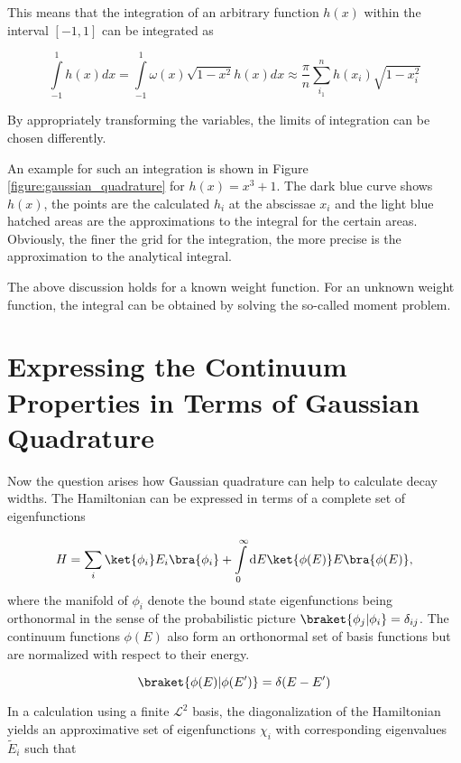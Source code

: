 This means that the integration of an arbitrary function $h(x)$ within
the interval $[-1,1]$ can be integrated as

\begin{equation}
  \int\limits_{-1}^1 h(x) dx = \int\limits_{-1}^1 \omega(x) \sqrt{1-x^2} h(x) dx
  \approx \frac \pi n \sum\limits_{i_1}^n h(x_i) \sqrt{1-x_i^2}
\end{equation}

By appropriately transforming the variables, the limits of integration can be
chosen differently.

An example for such an integration is shown in Figure \ref{figure:gaussian_quadrature}
for $h(x) = x^3 + 1$. The dark blue curve shows $h(x)$, the points are the
calculated $h_i$ at the abscissae $x_i$ and the light blue hatched areas are the
approximations to the integral for the certain areas. Obviously, the finer the
grid for the integration, the more precise is the approximation to
the analytical integral.

The above discussion holds for a known weight function.
For an unknown weight function, the integral can be obtained by solving the so-called
moment problem. \cite{Reinhardt79}




\section{Expressing the Continuum Properties in Terms of Gaussian Quadrature}
Now the question arises how Gaussian quadrature can help to calculate
decay widths.
The Hamiltonian can be expressed in terms of a complete set of eigenfunctions

\begin{equation} \label{equation:complete_hamniltonian}
  H = \sum\limits_i \ket{\phi_i} E_i \bra{\phi_i}
     + \int\limits_0^\infty \mathrm{d}E \ket{\phi(E)} E \bra{\phi(E)}  ,
\end{equation}
where the manifold of $\phi_i$ denote the bound state eigenfunctions being orthonormal
in the sense of the probabilistic picture $\braket{\phi_j|\phi_i} = \delta_{ij}$.
The continuum functions $\phi(E)$ also form an orthonormal set of basis functions
but are normalized with respect to their energy.

\begin{equation}
  \braket{\phi(E) | \phi(E')} = \delta(E-E')
\end{equation}

In a calculation using a finite $\mathcal{L}^2$ basis, the diagonalization of the
Hamiltonian yields an approximative set of eigenfunctions $\chi_i$ with corresponding
eigenvalues $\tilde{E}_i$ such that

